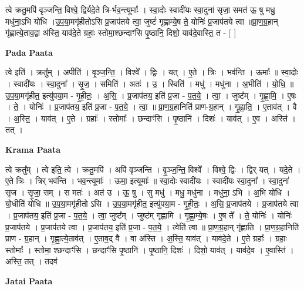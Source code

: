 \documentclass[17pt]{extarticle}
\begin{document}
त्वे क्रतु॒मपि॑ वृञ्जन्ति॒ विश्वे॒ द्विर्यदे॒ते त्रि-र्भव॒न्त्यूमाः᳚ । स्वा॒दोः स्वादी॑यः स्वा॒दुना॑ सृजा॒ समत॑ ऊ॒ षु मधु॒ मधु॑ना॒ऽभि यो॑धि ।उ॒प॒या॒मगृ॑हीतोऽसि प्र॒जाप॑तये त्वा॒ जुष्टं॑ गृह्णाम्ये॒ष ते॒ योनिः॑ प्र॒जाप॑तये त्वा ॥प्रा॒ण॒ग्र॒हान् गृ॑ह्णात्ये॒ताव॒द्वा अ॑स्ति॒ याव॑दे॒ते ग्रहाः॒ स्तोमा॒श्छन्दाꣳ॑सि पृ॒ष्ठानि॒ दिशो॒ याव॑दे॒वास्ति॒ त - [  ] \newline

\textbf{Pada Paata} \newline

त्वे इति॑ । क्रतु᳚म् । अपीति॑ । वृ॒ञ्ज॒न्ति॒ । विश्वे᳚ । द्विः । यत् । ए॒ते । त्रिः । भव॑न्ति । ऊमाः᳚ ॥ स्वा॒दोः । स्वादी॑यः । स्वा॒दुना᳚ । सृ॒ज॒ । समिति॑ । अतः॑ । उ॒ । स्विति॑ । मधु॑ । मधु॑ना । अ॒भीति॑ । यो॒धि॒ ॥ उ॒प॒या॒मगृ॑हीत॒ इत्यु॑पया॒म - गृ॒ही॒तः॒ । अ॒सि॒ । प्र॒जाप॑तय॒ इति॑ प्र॒जा - प॒त॒ये॒ । त्वा॒ । जुष्ट᳚म् । गृ॒ह्णा॒मि॒ । ए॒षः । ते॒ । योनिः॑ । प्र॒जाप॑तय॒ इति॑ प्र॒जा - प॒त॒ये॒ । त्वा॒ ॥ प्रा॒ण॒ग्र॒हानिति॑ प्राण-ग्र॒हान् । गृ॒ह्णा॒ति॒ । ए॒ताव॑त् । वै । अ॒स्ति॒ । याव॑त् । ए॒ते । ग्रहाः᳚ । स्तोमाः᳚ । छन्दाꣳ॑सि । पृ॒ष्ठानि॑ । दिशः॑ । याव॑त् । ए॒व । अस्ति॑ । तत् ।  \newline


\textbf{Krama Paata} \newline

त्वे क्रतु᳚म् । त्वे इति॒ त्वे । क्रतु॒मपि॑ । अपि॑ वृञ्जन्ति । वृ॒ञ्ज॒न्ति॒ विश्वे᳚ । विश्वे॒ द्विः । द्विर् यत् । यदे॒ते । ए॒ते त्रिः । त्रिर् भव॑न्ति । भव॒न्त्यूमाः᳚ । ऊमा॒ इत्यूमाः᳚ ॥ स्वा॒दोः स्वादी॑यः । स्वादी॑यः स्वा॒दुना᳚ । स्वा॒दुना॑ सृज । सृ॒जा॒ सम् । स मतः॑ । 
अत॑ उ । ऊ॒ षु । सु मधु॑ । मधु॒ मधु॑ना । मधु॑ना॒ ऽभि । अ॒भि यो॑धि । यो॒धीति॑ योधि ॥ उ॒प॒या॒मगृ॑हीतो ऽसि । उ॒प॒या॒मगृ॑हीत॒ इत्यु॑पया॒म - गृ॒ही॒तः॒ । अ॒सि॒ प्र॒जाप॑तये । प्र॒जाप॑तये त्वा । प्र॒जाप॑तय॒ इति॑ प्र॒जा - प॒त॒ये॒ । त्वा॒ जुष्ट᳚म् । जुष्ट॑म् गृह्णामि । गृ॒ह्णा॒म्ये॒षः । ए॒ष ते᳚ । ते॒ योनिः॑ । योनिः॑ प्र॒जाप॑तये । प्र॒जाप॑तये त्वा । प्र॒जाप॑तय॒ इति॑ प्र॒जा - प॒त॒ये॒ । त्वेति॑ त्वा ॥ प्रा॒ण॒ग्र॒हान् गृ॑ह्णाति । प्रा॒ण॒ग्र॒हानिति॑ प्राण - ग्र॒हान् । गृ॒ह्णा॒त्ये॒ताव॑त् । ए॒ताव॒द् वै । वा अ॑स्ति । अ॒स्ति॒ याव॑त् । याव॑दे॒ते । ए॒ते ग्रहाः᳚ । ग्रहाः॒ स्तोमाः᳚ । स्तोमा॒ श्छन्दाꣳ॑सि । छन्दाꣳ॑सि पृ॒ष्ठानि॑ । पृ॒ष्ठानि॒ दिशः॑ । दिशो॒ याव॑त् । याव॑दे॒व । ए॒वास्ति॑ । अस्ति॒ तत् । तदव॑ \newline

\textbf{Jatai Paata} \newline
\end{document}
